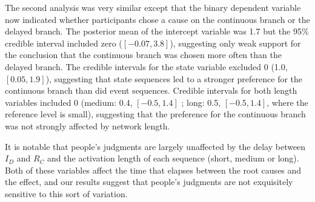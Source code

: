 \documentclass[10pt,letterpaper]{article}
\newcommand{\ev}[2]{$#1_#2$}
\begin{document}
The second analysis was very similar except that the binary dependent variable now indicated whether participants chose a cause on the continuous branch or the delayed branch. The posterior mean of the intercept variable was 1.7 but the 95\% credible interval included zero ($[-0.07, 3.8]$), suggesting only weak support for the conclusion that the continuous branch was chosen more often than the delayed branch. The credible intervals for the state variable excluded 0 (1.0, $[0.05, 1.9]$), suggesting that state sequences led to a stronger preference for the continuous branch than did event sequences.    Credible intervals for both length variables included 0 (medium: 0.4, $[-0.5,1.4]$ ; long: 0.5, $[-0.5,1.4]$, where the reference level is small), suggesting that the preference for the continuous branch was not strongly affected by network length. 

It is notable that people's judgments are largely unaffected by the delay between \ev{I}{D} and \ev{R}{C} and the activation length of each sequence (short, medium or long). Both of these variables affect the time that elapses between the root causes and the effect, and our results suggest that people's judgments are not exquisitely sensitive to this sort of variation.



\end{document}
